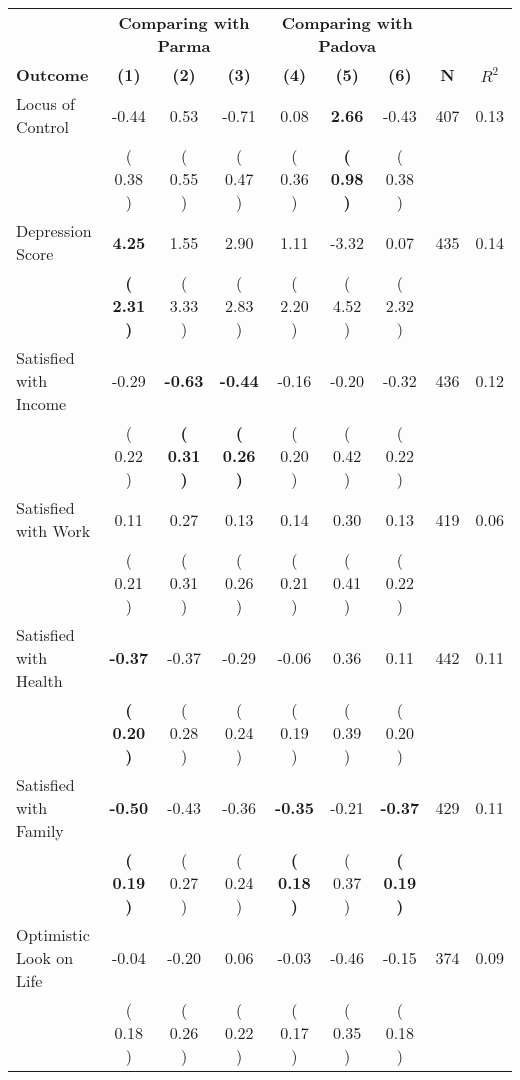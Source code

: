 \begin{tabular}{lcccccccc}
\toprule
 & \multicolumn{3}{c}{\textbf{Comparing with Parma}} & \multicolumn{3}{c}{\textbf{Comparing with Padova}} & \\
\cmidrule(lr){2-4} \cmidrule(lr){5-7} 
 \textbf{Outcome} & \textbf{(1)} & \textbf{(2)} & \textbf{(3)} & \textbf{(4)} & \textbf{(5)} & \textbf{(6)} & \textbf{N} & \textbf{$ R^2$} \\
\midrule
Locus of Control &     -0.44 &      0.53 &     -0.71 &      0.08 & \textbf{     2.66} &     -0.43 & 407 &       0.13 \\ 
 & (     0.38 ) & (     0.55 ) & (     0.47 ) & (     0.36 ) & \textbf{(     0.98 )} & (     0.38 ) & \\
Depression Score & \textbf{     4.25} &      1.55 &      2.90 &      1.11 &     -3.32 &      0.07 & 435 &       0.14 \\ 
 & \textbf{(     2.31 )} & (     3.33 ) & (     2.83 ) & (     2.20 ) & (     4.52 ) & (     2.32 ) & \\
Satisfied with Income &     -0.29 & \textbf{    -0.63} & \textbf{    -0.44} &     -0.16 &     -0.20 &     -0.32 & 436 &       0.12 \\ 
 & (     0.22 ) & \textbf{(     0.31 )} & \textbf{(     0.26 )} & (     0.20 ) & (     0.42 ) & (     0.22 ) & \\
Satisfied with Work &      0.11 &      0.27 &      0.13 &      0.14 &      0.30 &      0.13 & 419 &       0.06 \\ 
 & (     0.21 ) & (     0.31 ) & (     0.26 ) & (     0.21 ) & (     0.41 ) & (     0.22 ) & \\
Satisfied with Health & \textbf{    -0.37} &     -0.37 &     -0.29 &     -0.06 &      0.36 &      0.11 & 442 &       0.11 \\ 
 & \textbf{(     0.20 )} & (     0.28 ) & (     0.24 ) & (     0.19 ) & (     0.39 ) & (     0.20 ) & \\
Satisfied with Family & \textbf{    -0.50} &     -0.43 &     -0.36 & \textbf{    -0.35} &     -0.21 & \textbf{    -0.37} & 429 &       0.11 \\ 
 & \textbf{(     0.19 )} & (     0.27 ) & (     0.24 ) & \textbf{(     0.18 )} & (     0.37 ) & \textbf{(     0.19 )} & \\
Optimistic Look on Life &     -0.04 &     -0.20 &      0.06 &     -0.03 &     -0.46 &     -0.15 & 374 &       0.09 \\ 
 & (     0.18 ) & (     0.26 ) & (     0.22 ) & (     0.17 ) & (     0.35 ) & (     0.18 ) & \\

\end{tabular}
